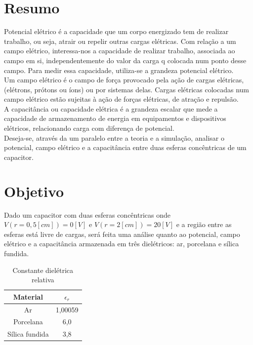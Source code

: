 \documentclass[a4paper]{article}
\begin{document}
	\large
	
	
	\begin{multicols}{2}
	
	\section{Resumo} \label{sec:Resumo}
	
	Potencial elétrico é a capacidade que um corpo energizado tem de realizar trabalho, ou seja, atrair ou repelir outras cargas elétricas. Com relação a um campo elétrico, interessa-nos a capacidade de realizar trabalho, associada ao campo em si, independentemente do valor da carga q colocada num ponto desse campo. Para medir essa capacidade, utiliza-se a grandeza potencial elétrico.\cite{wiki:peletrico}\\
	
	Um campo elétrico é o campo de força provocado pela ação de cargas elétricas, (elétrons, prótons ou íons) ou por sistemas delas. Cargas elétricas colocadas num campo elétrico estão sujeitas à ação de forças elétricas, de atração e repulsão.\cite{wiki:celetrico}\\
	
	A capacitância ou capacidade elétrica é a grandeza escalar que mede a capacidade de armazenamento de energia em equipamentos e dispositivos elétricos, relacionando carga com diferença de potencial.\cite{capacitancia}\\
	
	Deseja-se, através da um paralelo entre a teoria e a simulação, analisar o potencial, campo elétrico e a capacitância entre duas esferas concêntricas de um capacitor.
	
	\section{Objetivo} \label{sec:Objetivo}
	Dado um capacitor com duas esferas concêntricas onde $V(r=0,5[cm])=0 [V]$ e $V(r=2[cm])=20 [V]$ e a região entre as esferas está livre de cargas, será feita uma análise quanto ao potencial, campo elétrico e a capacitância armazenada em três dielétricos: ar, porcelana e sílica fundida.
	
	
	\begin{table} [H]
		\centering
		\caption{Constante dielétrica relativa \cite{wiki:xxx}\label{tab:constantes}}
		\begin{tabular}{|c|c|}
			\hline
			Material & $\epsilon _{r}$ \\
			\hline
			Ar & 1,00059 \\
			\hline
			Porcelana & 6,0 \\
			\hline
			Sílica fundida & 3,8 \\
			\hline
		\end{tabular}
	\end{table}
	

\end{multicols}
\end{document}
